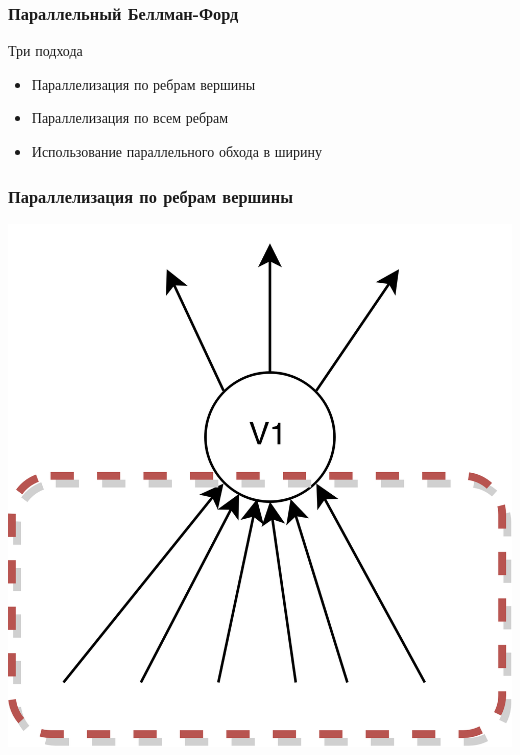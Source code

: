 \documentclass[10pt, compress]{beamer}
\begin{document}
\begin{frame}[fragile]
  \frametitle{Параллельный Беллман-Форд}
  Три подхода
  \begin{itemize}
    \item Параллелизация по ребрам вершины
    \item Параллелизация по всем ребрам
    \item Использование параллельного обхода в ширину
  \end{itemize}
\end{frame}

\begin{frame}[fragile]
  \frametitle{Параллелизация по ребрам вершины}
  {\vspace{-2em}\begin{center}\includegraphics[height=0.75\textheight]{images/bf_par_1.png}\end{center}}
\end{frame}
\end{document}
